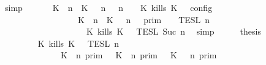 \begin{isabellebody}
\ simp\isanewline
\ \ \isamarkupfalse%
\ \isamarkupfalse%
\ {\isacartoucheopen}{\isasymlbrakk}\ {\isacharparenleft}{\isacharparenleft}K\ {\isasymUp}\ n{\isacharparenright}\ {\isacharhash}\ {\isacharparenleft}K\ {\isasymnot}{\isasymUp}\ {\isasymge}\ n{\isacharparenright}\ {\isacharhash}\ {\isasymGamma}{\isacharparenright}{\isacharcomma}\ n\ {\isasymturnstile}\ {\isasymPsi}\ {\isasymtriangleright}\ {\isacharparenleft}{\isacharparenleft}K\ kills\ K\ {\isacharhash}\ {\isasymPhi}{\isacharparenright}\ {\isasymrbrakk}\isactrlsub c\isactrlsub o\isactrlsub n\isactrlsub f\isactrlsub i\isactrlsub g\isanewline
\ \ \ \ \ \ \ \ \ \ \ \ \ \ \ \ {\isacharequal}\ {\isasymlbrakk}{\isasymlbrakk}\ {\isacharparenleft}K\ {\isasymUp}\ n{\isacharparenright}\ {\isacharhash}\ {\isacharparenleft}K\ {\isasymnot}{\isasymUp}\ {\isasymge}\ n{\isacharparenright}\ {\isacharhash}\ {\isasymGamma}\ {\isasymrbrakk}{\isasymrbrakk}\isactrlsub p\isactrlsub r\isactrlsub i\isactrlsub m\ {\isasyminter}\ {\isasymlbrakk}{\isasymlbrakk}\ {\isasymPsi}\ {\isasymrbrakk}{\isasymrbrakk}\isactrlsub T\isactrlsub E\isactrlsub S\isactrlsub L\isactrlbsup {\isasymge}\ n\isactrlesup \isanewline
\ \ \ \ \ \ \ \ \ \ \ \ \ \ \ \ \ \ {\isasyminter}\ {\isasymlbrakk}{\isasymlbrakk}\ {\isacharparenleft}K\ kills\ K\ {\isacharhash}\ {\isasymPhi}\ {\isasymrbrakk}{\isasymrbrakk}\isactrlsub T\isactrlsub E\isactrlsub S\isactrlsub L\isactrlbsup {\isasymge}\ Suc\ n\isactrlesup {\isacartoucheclose}\ \isamarkupfalse%
\ simp\isanewline
\ \ \isamarkupfalse%
\ \isamarkupfalse%
\ {\isacharquery}thesis\isanewline
\ \ \ \ \isamarkupfalse%
\ {\isacharminus}\isanewline
\ \ \ \ \ \ \isamarkupfalse%
\ {\isacartoucheopen}{\isasymlbrakk}{\isasymlbrakk}\ {\isacharparenleft}K\ kills\ K\ {\isacharhash}\ {\isasymPsi}\ {\isasymrbrakk}{\isasymrbrakk}\isactrlsub T\isactrlsub E\isactrlsub S\isactrlsub L\isactrlbsup {\isasymge}\ n\isactrlesup \isanewline
\ \ \ \ \ \ \ \ \ \ \ \ {\isacharequal}\ {\isacharparenleft}{\isasymlbrakk}\ {\isacharparenleft}K\ {\isasymnot}{\isasymUp}\ n{\isacharparenright}\ {\isasymrbrakk}\isactrlsub p\isactrlsub r\isactrlsub i\isactrlsub m\ {\isasymunion}\ {\isasymlbrakk}\ {\isacharparenleft}K\ {\isasymUp}\ n{\isacharparenright}\ {\isasymrbrakk}\isactrlsub p\isactrlsub r\isactrlsub i\isactrlsub m\ {\isasyminter}\ {\isasymlbrakk}\ {\isacharparenleft}K\ {\isasymnot}{\isasymUp}\ {\isasymge}\ n{\isacharparenright}\ {\isasymrbrakk}\isactrlsub p\isactrlsub r\isactrlsub i\isactrlsub m{\isacharparenright}\isanewline

\end{isabellebody}
